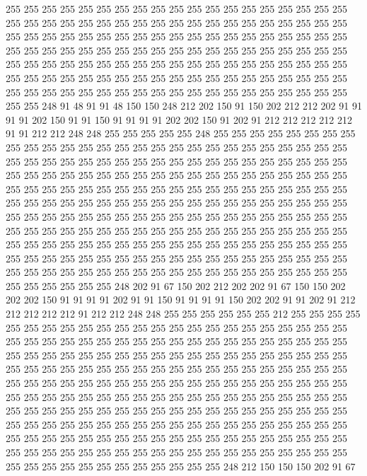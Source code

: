 255 255 255 255 255 255 255 255 255 255 255 255 255 255 255 255 255 255 255 255
255 255 255 255 255 255 255 255 255 255 255 255 255 255 255 255 255 255 255 255
255 255 255 255 255 255 255 255 255 255 255 255 255 255 255 255 255 255 255 255
255 255 255 255 255 255 255 255 255 255 255 255 255 255 255 255 255 255 255 255
255 255 255 255 255 255 255 255 255 255 255 255 255 255 255 255 255 255 255 255
255 255 255 255 255 255 255 255 255 255 255 255 255 255 255 255 255 255 255 255
255 255 255 255 255 255 255 255 255 255 255 255 255 255 255 248 91 48 91 91
48 150 150 248 212 202 150 91 150 202 212 212 202 91 91 91 91 202 150 91
91 150 91 91 91 91 202 202 150 91 202 91 212 212 212 212 212 91 91 212
212 248 248 255 255 255 255 255 248 255 255 255 255 255 255 255 255 255 255 255
255 255 255 255 255 255 255 255 255 255 255 255 255 255 255 255 255 255 255 255
255 255 255 255 255 255 255 255 255 255 255 255 255 255 255 255 255 255 255 255
255 255 255 255 255 255 255 255 255 255 255 255 255 255 255 255 255 255 255 255
255 255 255 255 255 255 255 255 255 255 255 255 255 255 255 255 255 255 255 255
255 255 255 255 255 255 255 255 255 255 255 255 255 255 255 255 255 255 255 255
255 255 255 255 255 255 255 255 255 255 255 255 255 255 255 255 255 255 255 255
255 255 255 255 255 255 255 255 255 255 255 255 255 255 255 255 255 255 255 255
255 255 255 255 255 255 255 255 255 255 255 255 255 255 255 255 255 255 255 255
255 255 255 255 255 255 255 255 255 255 255 255 255 255 255 255 255 255 255 255
255 255 255 255 255 255 255 255 255 255 255 255 255 248 202 91 67 150 202 212
202 202 91 67 150 150 202 202 202 150 91 91 91 91 202 91 91 150 91 91
91 91 150 202 202 91 91 202 91 212 212 212 212 212 91 212 212 248 248 255
255 255 255 255 255 212 255 255 255 255 255 255 255 255 255 255 255 255 255 255
255 255 255 255 255 255 255 255 255 255 255 255 255 255 255 255 255 255 255 255
255 255 255 255 255 255 255 255 255 255 255 255 255 255 255 255 255 255 255 255
255 255 255 255 255 255 255 255 255 255 255 255 255 255 255 255 255 255 255 255
255 255 255 255 255 255 255 255 255 255 255 255 255 255 255 255 255 255 255 255
255 255 255 255 255 255 255 255 255 255 255 255 255 255 255 255 255 255 255 255
255 255 255 255 255 255 255 255 255 255 255 255 255 255 255 255 255 255 255 255
255 255 255 255 255 255 255 255 255 255 255 255 255 255 255 255 255 255 255 255
255 255 255 255 255 255 255 255 255 255 255 255 255 255 255 255 255 255 255 255
255 255 255 255 255 255 255 255 255 255 255 255 255 255 255 255 255 255 255 255
255 255 255 255 255 255 255 255 255 255 255 255 248 212 150 150 150 202 91 67
